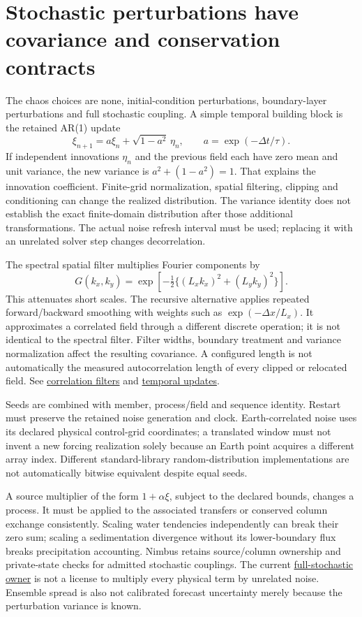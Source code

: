 \section{Stochastic perturbations have covariance and conservation contracts}
\label{chaos-theory}

The chaos choices are none, initial-condition perturbations, boundary-layer
perturbations and full stochastic coupling. A simple temporal building block
is the retained AR(1) update
\[
 \xi_{n+1}=a\xi_n+\sqrt{1-a^2}\,\eta_n,
 \qquad a=\exp(-\Delta t/\tau).
\]
If independent innovations $\eta_n$ and the previous field each have zero mean
and unit variance, the new variance is $a^2+(1-a^2)=1$. That explains the
innovation coefficient. Finite-grid normalization, spatial filtering,
clipping and conditioning can change the realized distribution. The variance
identity does not establish the exact finite-domain distribution after those
additional transformations. The actual noise refresh interval must
be used; replacing it with an unrelated solver step changes decorrelation.

The spectral spatial filter multiplies Fourier components by
\[
 G(k_x,k_y)=\exp[-\tfrac12\{(L_xk_x)^2+(L_yk_y)^2\}].
\]
This attenuates short scales. The recursive alternative applies repeated
forward/backward smoothing with weights such as $\exp(-\Delta x/L_x)$.
It approximates a correlated field through a different discrete operation;
it is not identical to the spectral filter. Filter widths, boundary treatment
and variance normalization affect the resulting covariance. A configured
length is not automatically the measured autocorrelation length of every
clipped or relocated field. See
\href{../src/chaos/base/correlation_filter.cpp}{correlation filters} and
\href{../src/chaos/base/perturbation_field.cpp}{temporal updates}.

Seeds are combined with member, process/field and sequence identity. Restart
must preserve the retained noise generation and clock. Earth-correlated noise
uses its declared physical control-grid coordinates; a translated window must
not invent a new forcing realization solely because an Earth point acquires
a different array index. Different standard-library random-distribution
implementations are not automatically bitwise equivalent despite equal seeds.

A source multiplier of the form $1+\alpha\xi$, subject to the declared bounds,
changes a process. It must be applied to the associated transfers or conserved
column exchange consistently. Scaling water tendencies independently can break
their zero sum; scaling a sedimentation divergence without its lower-boundary
flux breaks precipitation accounting. Nimbus retains source/column ownership
and private-state checks for admitted stochastic couplings. The current
\href{../src/chaos/schemes/full_stochastic/full_stochastic.cpp}{full-stochastic
owner} is not a license to multiply every physical term by unrelated noise.
Ensemble spread is also not calibrated forecast uncertainty merely because
the perturbation variance is known.

